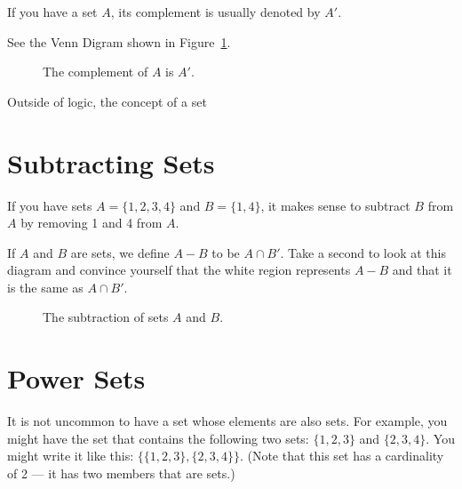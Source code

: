 If you have a set $A$, its complement is usually denoted by $A'$.

See the Venn Digram shown in Figure~\ref{fig:complement_set}.
\begin{figure}[htbp]
    \centering
    \caption{The complement of $A$ is $A'$.}
    \label{fig:complement_set}
\end{figure}

Outside of logic, the concept of a set 
\section{Subtracting Sets}
If you have sets $A = \{1,2,3,4\}$ and $B = \{1, 4\}$, it makes sense
to subtract $B$ from $A$ by removing 1 and 4 from $A$.

If $A$ and $B$ are sets, we define $A - B$ to be $A \cap B'$.  Take a
second to look at this diagram and convince yourself that the white
region represents $A - B$ and that it is the same as $A \cap B'$.

\begin{figure}[htbp]
    \centering
    \caption{The subtraction of sets $A$ and $B$.}
    \label{fig:subtraction_sets}
\end{figure}

\section{Power Sets}

It is not uncommon to have a set whose elements are also sets.  For
example, you might have the set that contains the following two sets:
$\{1,2,3\}$ and $\{2,3,4\}$. You might write it like this: $\{
\{1,2,3\}, \{2,3,4\} \}$. (Note that this set has a cardinality of 2
--- it has two members that are sets.)

